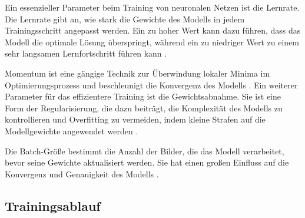 Ein essenzieller Parameter beim Training von neuronalen Netzen ist die Lernrate. Die Lernrate gibt an, wie stark die Gewichte des Modells in jedem Trainingsschritt angepasst werden. Ein zu hoher Wert kann dazu führen, dass das Modell die optimale Lösung \glqq überspringt\grqq{}, während ein zu niedriger Wert zu einem sehr langsamen Lernfortschritt führen kann \cite{learnrate}.

Momentum ist eine gängige Technik zur Überwindung lokaler Minima im Optimierungsprozess und beschleunigt die Konvergenz des Modells \cite{pmlr-v119-cutkosky20b}\cite{pmlr-v28-sutskever13}.
Ein weiterer Parameter für das effizientere Training ist die Gewichtsabnahme. Sie ist eine Form der Regularisierung, die dazu beiträgt, die Komplexität des Modells zu kontrollieren und Overfitting zu vermeiden, indem kleine Strafen auf die Modellgewichte angewendet werden \cite{Ying_2019}\cite{doi:10.1021/ci0342472}.

Die Batch-Größe bestimmt die Anzahl der Bilder, die das Modell verarbeitet, bevor seine Gewichte aktualisiert werden. Sie hat einen großen Einfluss auf die Konvergenz und Genauigkeit des Modells \cite{KANDEL2020312}.
\subsection{Trainingsablauf}



